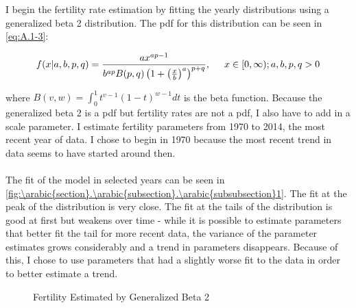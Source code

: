 \documentclass[10pt]{article}
\renewcommand{\thesection}{\arabic{section}}
\renewcommand{\thesubsection}{\thesection.\arabic{subsection}}
\renewcommand{\thesubsubsection}{\thesubsection.\arabic{subsubsection}}
\numberwithin{equation}{subsection}
\renewcommand{\subsubsection}[2][]{\oldsubsubsection[#1]{#2}\index{#1}\label{sec:\thesubsubsection}}
\newcommand*{\FigureDir}{../../graphs}
\begin{document}
\begin{appendices}
\subsubsection{Fertility Rates}

I begin the fertility rate estimation by fitting the yearly distributions using a generalized beta 2 distribution. The pdf for this distribution can be seen in \ref{eq:A.1-3}:

\begin{equation}
   f(x|a, b, p, q) = \frac{ax^{ap-1}}{b^{ap}B(p,q)\left(1 + \left(\frac{x}{b}\right)^a\right)^{p+q}}, \hspace{5mm} x \in [0,\infty); a, b, p, q > 0   
\end{equation}

\noindent
where \(B(v,w) = \int_0^1 t^{v-1}(1-t)^{w-1}dt\) is the beta function. Because the generalized beta 2 is a pdf but fertility rates are not a pdf, I also have to add in a scale parameter. I estimate fertility parameters from 1970 to 2014, the most recent year of data. I chose to begin in 1970 because the most recent trend in data seems to have started around then.
\\\\
The fit of the model in selected years can be seen in \autoref{fig:\thesubsubsection1}. The fit at the peak of the distribution is very close. The fit at the tails of the distribution is good at first but weakens over time - while it is possible to estimate parameters that better fit the tail for more recent data, the variance of the parameter estimates grows considerably and a trend in parameters disappears. Because of this, I chose to use parameters that had a slightly worse fit to the data in order to better estimate a trend.

\begin{figure}[!ht]
   \centering
   \caption{\label{fig:\thesubsubsection1}Fertility Estimated by Generalized Beta 2}
\end{figure}


\end{appendices}
\end{document}
